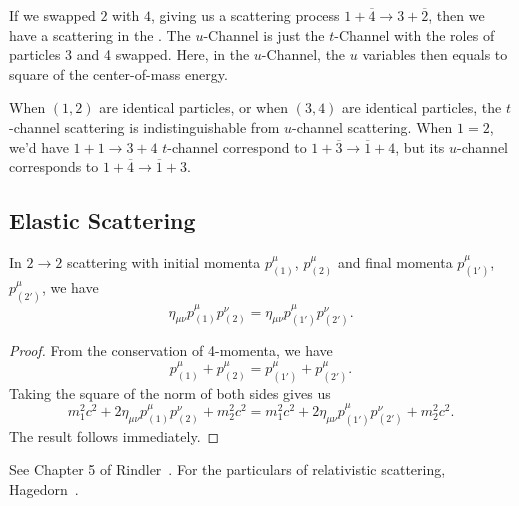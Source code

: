 If we swapped $2$ with $4$, giving us a scattering process
$1+\overline{4}\to3+\overline{2}$,
then we have a scattering in the . The $u$-Channel
is just the $t$-Channel with the roles of particles 3 and 4 swapped.
Here, in the $u$-Channel, the $u$ variables then equals to square of the
center-of-mass energy.

\begin{remark}
When $(1,2)$ are identical particles, or when $(3,4)$ are identical
particles, the $t$-channel scattering is indistinguishable from
$u$-channel scattering. When $1=2$, we'd have $1+1\to3+4$
$t$-channel correspond to $1+\overline{3}\to\overline{1}+4$,
but its $u$-channel corresponds to $1+\overline{4}\to\overline{1}+3$.
\end{remark}

\subsection{Elastic Scattering}

\begin{lemma}
In $2\to2$ scattering with initial momenta $p_{(1)}^{\mu}$, $p_{(2)}^{\mu}$
and final momenta $p_{(1')}^{\mu}$, $p_{(2')}^{\mu}$, we have
\begin{equation}
\eta_{\mu\nu}p_{(1)}^{\mu}p_{(2)}^{\nu} = \eta_{\mu\nu}p_{(1')}^{\mu}p_{(2')}^{\nu}.
\end{equation}
\end{lemma}

\begin{proof}
  From the conservation of 4-momenta, we have
  \begin{equation}
p_{(1)}^{\mu} + p_{(2)}^{\mu} = p_{(1')}^{\mu} + p_{(2')}^{\mu}.
  \end{equation}
  Taking the square of the norm of both sides gives us
  \begin{equation}
m_{1}^{2}c^{2} + 2\eta_{\mu\nu}p_{(1)}^{\mu}p_{(2)}^{\nu} + m_{2}^{2}c^{2}
= m_{1}^{2}c^{2} + 2\eta_{\mu\nu}p_{(1')}^{\mu}p_{(2')}^{\nu} + m_{2}^{2}c^{2}.
  \end{equation}
  The result follows immediately.
\end{proof}


See Chapter 5 of Rindler~\cite{Rindler:1991sr}. For the particulars of
relativistic scattering, Hagedorn~\cite{Hagedorn:1963hdh}.

\endinput